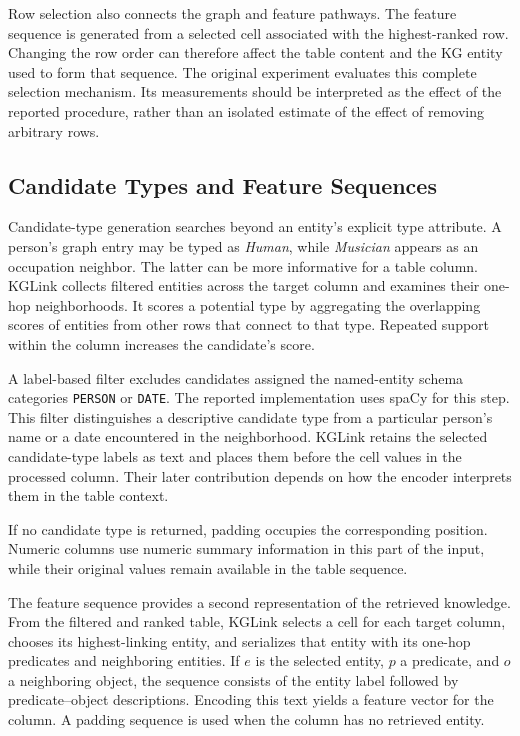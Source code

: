 Row selection also connects the graph and feature pathways. The feature sequence is generated from a selected cell associated with the highest-ranked row. Changing the row order can therefore affect the table content and the KG entity used to form that sequence. The original experiment evaluates this complete selection mechanism. Its measurements should be interpreted as the effect of the reported procedure, rather than an isolated estimate of the effect of removing arbitrary rows.

\subsection{Candidate Types and Feature Sequences}
\label{sec:kglink:types-features}

Candidate-type generation searches beyond an entity's explicit type attribute. A person's graph entry may be typed as \emph{Human}, while \emph{Musician} appears as an occupation neighbor. The latter can be more informative for a table column. KGLink collects filtered entities across the target column and examines their one-hop neighborhoods. It scores a potential type by aggregating the overlapping scores of entities from other rows that connect to that type. Repeated support within the column increases the candidate's score.

A label-based filter excludes candidates assigned the named-entity schema categories \texttt{PERSON} or \texttt{DATE}. The reported implementation uses spaCy for this step. This filter distinguishes a descriptive candidate type from a particular person's name or a date encountered in the neighborhood. KGLink retains the selected candidate-type labels as text and places them before the cell values in the processed column. Their later contribution depends on how the encoder interprets them in the table context.

If no candidate type is returned, padding occupies the corresponding position. Numeric columns use numeric summary information in this part of the input, while their original values remain available in the table sequence.

The feature sequence provides a second representation of the retrieved knowledge. From the filtered and ranked table, KGLink selects a cell for each target column, chooses its highest-linking entity, and serializes that entity with its one-hop predicates and neighboring entities. If $e$ is the selected entity, $p$ a predicate, and $o$ a neighboring object, the sequence consists of the entity label followed by predicate--object descriptions. Encoding this text yields a feature vector for the column. A padding sequence is used when the column has no retrieved entity.

